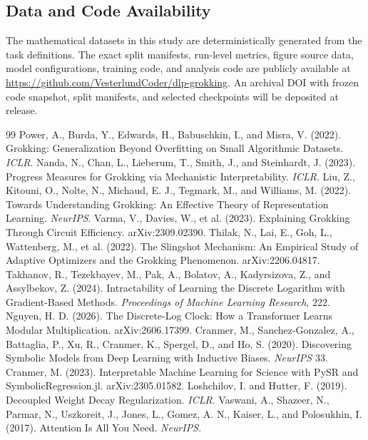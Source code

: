 \documentclass[11pt]{article}
\begin{document}
\subsection*{Data and Code Availability}
The mathematical datasets in this study are deterministically generated from the task definitions. The exact split manifests, run-level metrics, figure source data, model configurations, training code, and analysis code are publicly available at \url{https://github.com/VesterlundCoder/dlp-grokking}. An archival DOI with frozen code snapshot, split manifests, and selected checkpoints will be deposited at release.


\begin{thebibliography}{99}
 Power, A., Burda, Y., Edwards, H., Babuschkin, I., and Misra, V. (2022). Grokking: Generalization Beyond Overfitting on Small Algorithmic Datasets. \emph{ICLR}.
 Nanda, N., Chan, L., Lieberum, T., Smith, J., and Steinhardt, J. (2023). Progress Measures for Grokking via Mechanistic Interpretability. \emph{ICLR}.
 Liu, Z., Kitouni, O., Nolte, N., Michaud, E. J., Tegmark, M., and Williams, M. (2022). Towards Understanding Grokking: An Effective Theory of Representation Learning. \emph{NeurIPS}.
 Varma, V., Davies, W., et al. (2023). Explaining Grokking Through Circuit Efficiency. arXiv:2309.02390.
 Thilak, N., Lai, E., Goh, L., Wattenberg, M., et al. (2022). The Slingshot Mechanism: An Empirical Study of Adaptive Optimizers and the Grokking Phenomenon. arXiv:2206.04817.
 Takhanov, R., Tezekbayev, M., Pak, A., Bolatov, A., Kadyrsizova, Z., and Assylbekov, Z. (2024). Intractability of Learning the Discrete Logarithm with Gradient-Based Methods. \emph{Proceedings of Machine Learning Research}, 222.
 Nguyen, H. D. (2026). The Discrete-Log Clock: How a Transformer Learns Modular Multiplication. arXiv:2606.17399.
 Cranmer, M., Sanchez-Gonzalez, A., Battaglia, P., Xu, R., Cranmer, K., Spergel, D., and Ho, S. (2020). Discovering Symbolic Models from Deep Learning with Inductive Biases. \emph{NeurIPS} 33.
 Cranmer, M. (2023). Interpretable Machine Learning for Science with PySR and SymbolicRegression.jl. arXiv:2305.01582.
 Loshchilov, I. and Hutter, F. (2019). Decoupled Weight Decay Regularization. \emph{ICLR}.
 Vaswani, A., Shazeer, N., Parmar, N., Uszkoreit, J., Jones, L., Gomez, A. N., Kaiser, L., and Polosukhin, I. (2017). Attention Is All You Need. \emph{NeurIPS}.
\end{thebibliography}
\end{document}
